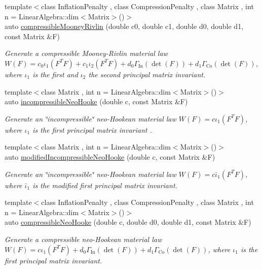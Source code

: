 \begin{DoxyCompactItemize}
{\footnotesize template$<$class Inflation\+Penalty , class Compression\+Penalty , class Matrix , int n = Linear\+Algebra\+::dim$<$\+Matrix$>$()$>$ }\\auto \hyperlink{group__Rubber_ga9a1894daa10a0bdcc620c6c41ecb6f19}{compressible\+Mooney\+Rivlin} (double c0, double c1, double d0, double d1, const Matrix \&F)
\begin{DoxyCompactList}\small\item\em Generate a compressible Mooney-\/\+Rivlin material law $ W(F)=c_0\iota_1(F^T F) + c_1\iota_2(F^T F) + d_0\Gamma_\mathrm{In}(\det(F))+d_1\Gamma_\mathrm{Co}(\det(F)) $, where $\iota_1$ is the first and $\iota_2$ the second principal matrix invariant. \end{DoxyCompactList}\item 
{\footnotesize template$<$class Matrix , int n = Linear\+Algebra\+::dim$<$\+Matrix$>$()$>$ }\\auto \hyperlink{group__Rubber_ga5bb28aef7006413775791998936d6b81}{incompressible\+Neo\+Hooke} (double c, const Matrix \&F)
\begin{DoxyCompactList}\small\item\em Generate an \char`\"{}incompressible\char`\"{} neo-\/\+Hookean material law $ W(F)=c\iota_1(F^T F) $, where $\iota_1$ is the first principal matrix invariant . \end{DoxyCompactList}\item 
{\footnotesize template$<$class Matrix , int n = Linear\+Algebra\+::dim$<$\+Matrix$>$()$>$ }\\auto \hyperlink{group__Rubber_gaf6f5ab6a379ef03d513acc5042731a01}{modified\+Incompressible\+Neo\+Hooke} (double c, const Matrix \&F)
\begin{DoxyCompactList}\small\item\em Generate an \char`\"{}incompressible\char`\"{} neo-\/\+Hookean material law $ W(F)=c\bar\iota_1(F^T F) $, where $\bar\iota_1$ is the modified first principal matrix invariant. \end{DoxyCompactList}\item 
{\footnotesize template$<$class Inflation\+Penalty , class Compression\+Penalty , class Matrix , int n = Linear\+Algebra\+::dim$<$\+Matrix$>$()$>$ }\\auto \hyperlink{group__Rubber_gac5c39cd9de55f4f0220a806cf28a7b30}{compressible\+Neo\+Hooke} (double c, double d0, double d1, const Matrix \&F)
\begin{DoxyCompactList}\small\item\em Generate a compressible neo-\/\+Hookean material law $ W(F)=c\iota_1(F^T F)+d_0\Gamma_\mathrm{In}(\det(F))+d_1\Gamma_\mathrm{Co}(\det(F)) $, where $\iota_1$ is the first principal matrix invariant. \end{DoxyCompactList}\item 

\end{DoxyCompactItemize}
